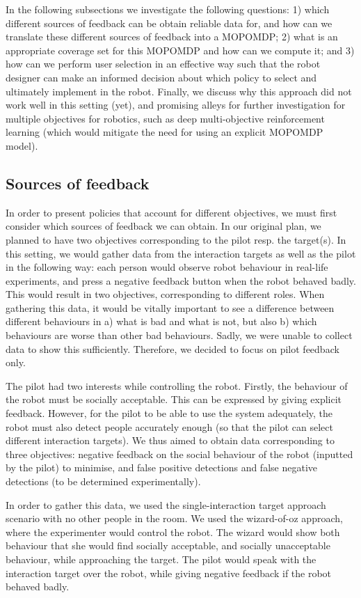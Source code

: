 \documentclass[a4paper,11pt]{report}
\begin{document}
In the following subsections we investigate the following questions: 1) which different sources of feedback can be obtain reliable data for, and how can we translate these different sources of feedback into a MOPOMDP; 2) what is an appropriate coverage set for this MOPOMDP and how can we compute it; and 3) how can we perform user selection in an effective way such that the robot designer can make an informed decision about which policy to select and ultimately implement in the robot. Finally, we discuss why this approach did not work well in this setting (yet), and promising alleys for further investigation for multiple objectives for robotics, such as deep multi-objective reinforcement learning (which would mitigate the need for using an explicit MOPOMDP model). 

\subsection{Sources of feedback}
In order to present policies that account for different objectives, we must first consider which sources of feedback we can obtain. In our original plan, we planned to have two objectives corresponding to the pilot resp. the target(s). In this setting, we would gather data from the interaction targets as well as the pilot in the following way: each person would observe robot behaviour in real-life experiments, and press a negative feedback button when the robot behaved badly. This would result in two objectives, corresponding to different roles. When gathering this data, it would be vitally important to see a difference between different behaviours in a) what is bad and what is not, but also b) which behaviours are worse than other bad behaviours. Sadly, we were unable to collect data to show this sufficiently. Therefore, we decided to focus on pilot feedback only. 

The pilot had two interests while controlling the robot. Firstly, the behaviour of the robot must be socially acceptable. This can be expressed by giving explicit feedback. However, for the pilot to be able to use the system adequately, the robot must also detect people accurately enough (so that the pilot can select different interaction targets). We thus aimed to obtain data corresponding to three objectives: negative feedback on the social behaviour of the robot (inputted by the pilot) to minimise, and false positive detections and false negative detections (to be determined experimentally). 

In order to gather this data, we used the single-interaction target approach scenario with no other people in the room. We used the wizard-of-oz approach, where the experimenter would control the robot. The wizard would show both behaviour that she would find socially acceptable, and socially unacceptable behaviour, while approaching the target. The pilot would speak with the interaction target over the robot, while giving negative feedback if the robot behaved badly. 
\end{document}
